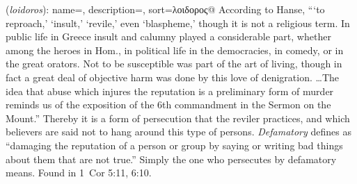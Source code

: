 \item[Defamatory,]

(\textit{loidoros}):
{
    name=,
    description={},
    sort=λοιδορος@
}
According to Hanse, ```to reproach,' `insult,' `revile,' even `blaspheme,' though it is not a religious term. In public life in Greece insult and calumny played a considerable part, whether among the heroes in Hom., in political life in the democracies, in comedy, or in the great orators. Not to be susceptible was part of the art of living, though in fact a great deal of objective harm was done by this love of denigration. \ldots The idea that abuse which injures the reputation is a preliminary form of murder reminds us of the exposition of the 6th commandment in the Sermon on the Mount.'' 
Thereby it is a form of persecution that the reviler practices, and which believers are said not to hang around this type of persons. \emph{Defamatory} defines as ``damaging the reputation of a person or group by saying or writing bad things about them that are not true.'' Simply the one who persecutes by defamatory means.
Found in 1~Cor 5:11, 6:10.
